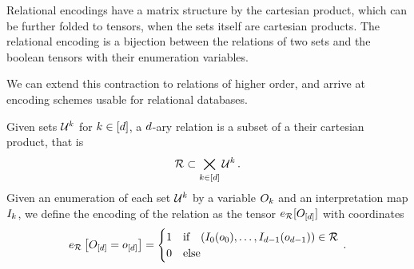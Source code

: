 Relational encodings have a matrix structure by the cartesian product, which can be further folded to tensors, when the sets itself are cartesian products.
The relational encoding is a bijection between the relations of two sets and the boolean tensors with their enumeration variables.

%




We can extend this contraction to relations of higher order, and arrive at encoding schemes usable for relational databases.

\begin{definition}\label{def:daryRelation}
	Given sets $\mathcal{U}^{k}$ for $k\in[d]$, a $d$-ary relation is a subset of a their cartesian product, that is
	\begin{align*}
		\mathcal{R} \subset\bigtimes_{k\in[d]} \mathcal{U}^{k} \, .
	\end{align*}
	Given an enumeration of each set $\mathcal{U}^{k}$ by a variable $O_{k}$ and an interpretation map $I_{k}$, we define the encoding of the relation as the tensor $e_{\mathcal{R}}[O_{[d]}]$ with coordinates
	\begin{align*}
		e_{\mathcal{R}}\left[O_{[d]}=o_{[d]}\right]
		= \begin{cases}
		1 & \text{if} \quad (I_{0}(o_{0}),\ldots,I_{d-1}(o_{d-1})) \in \mathcal{R} \\
		0 & \text{else}
		\end{cases} \, .
	\end{align*}
\end{definition}


